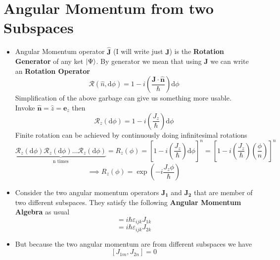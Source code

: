 \documentclass[10pt]{article}
\newcommand{\hb}{\hbar}
\renewcommand{\vec}{\mathbf}
\renewcommand{\vec}{\mathbf}
\begin{document}
\section{Angular Momentum from two Subspaces}
\begin{itemize}
	\item Angular Momentum operator $\hat{\vec{J}}$ (I will write just $\vec{J}$) is the \textbf{Rotation Generator} of any ket $\ket{\Psi}$. By generator we mean that using $\vec{J}$ we can write an \textbf{Rotation Operator} 
		\begin{equation}
			\mathcal R (\hat{n}, \mathrm{d} \phi) = 1 - i \left(\frac{\vec{J} \cdot  \hat{\vec{n}}}{\hb}\right) \mathrm{d} \phi
		\end{equation}
		Simplification of the above garbage can give us something more usable. Invoke $\hat{\vec{n}} = \hat{z} = \vec{e}_z$ then 
		\[
		\mathcal R_z(\mathrm{d} \phi) = 1- i \left(\frac{J_z}{\hb}\right) \mathrm{d} \phi
		\]
		Finite rotation can be achieved by continuously doing infinitesimal rotations 
		\[\underbrace{
		\mathcal R_z(\mathrm{d} \phi)
		\mathcal R_z(\mathrm{d} \phi)\ldots
	\mathcal R_z(\mathrm{d} \phi)}_{\text{n times}} = \mathit R_z(\phi) = 
	\left[ 1 - i \left(\frac{J_z}{\hb}\right) \mathrm{d} \phi \right] ^{n}
	= 
	\left[ 1 - i \left(\frac{J_z}{\hb}\right)  \left(\frac{\phi}{n}\right) \right] ^{n}
		\] 
		\begin{equation} \implies
			\mathit R_z (\phi) = \exp \left( - i \frac{J_z \phi}{\hb}\right)
		\end{equation}
	\item Consider the two angular momentum operators $\vec{J_1}$ and $\vec{J_2}$ that are member of two different subspaces. They satisfy the following \textbf{Angular Momentum Algebra} as usual
		\begin{equation}
			[J_{1i}, J_{1j}] = i \hb \varepsilon_{ijk} J_{1k}
		\end{equation}
		\begin{equation}
			[J_{2i}, J_{2j}] = i \hb \varepsilon_{ijk} J_{2k}
		\end{equation}
	\item But because the two angular momentum are from different subspaces we have 
		\[
			[J_{1m}, J_{2n}] = 0 
		\] 
\end{itemize}
\end{document}
